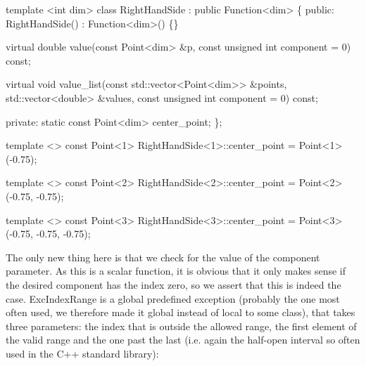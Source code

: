 \begin{DoxyCode}
\textcolor{keyword}{template} <\textcolor{keywordtype}{int} dim>
\textcolor{keyword}{class }RightHandSide : \textcolor{keyword}{public} Function<dim> \{
\textcolor{keyword}{public}:
    RightHandSide() : Function<dim>() \{\}

    \textcolor{keyword}{virtual} \textcolor{keywordtype}{double} value(\textcolor{keyword}{const} Point<dim> &p,
                         \textcolor{keyword}{const} \textcolor{keywordtype}{unsigned} \textcolor{keywordtype}{int} component = 0) \textcolor{keyword}{const};

    \textcolor{keyword}{virtual} \textcolor{keywordtype}{void} value\_list(\textcolor{keyword}{const} std::vector<Point<dim>> &points,
                            std::vector<double> &values,
                            \textcolor{keyword}{const} \textcolor{keywordtype}{unsigned} \textcolor{keywordtype}{int} component = 0) \textcolor{keyword}{const};

\textcolor{keyword}{private}:
    \textcolor{keyword}{static} \textcolor{keyword}{const} Point<dim> center\_point;
\};


\textcolor{keyword}{template} <>
\textcolor{keyword}{const} Point<1> RightHandSide<1>::center\_point = Point<1>(-0.75);

\textcolor{keyword}{template} <>
\textcolor{keyword}{const} Point<2> RightHandSide<2>::center\_point = Point<2>(-0.75, -0.75);

\textcolor{keyword}{template} <>
\textcolor{keyword}{const} Point<3> RightHandSide<3>::center\_point = Point<3>(-0.75, -0.75, -0.75);
\end{DoxyCode}


The only new thing here is that we check for the value of the {\ttfamily component} parameter. As this is a scalar function, it is obvious that it only makes sense if the desired component has the index zero, so we assert that this is indeed the case. {\ttfamily Exc\+Index\+Range} is a global predefined exception (probably the one most often used, we therefore made it global instead of local to some class), that takes three parameters\+: the index that is outside the allowed range, the first element of the valid range and the one past the last (i.\+e. again the half-\/open interval so often used in the C++ standard library)\+:


